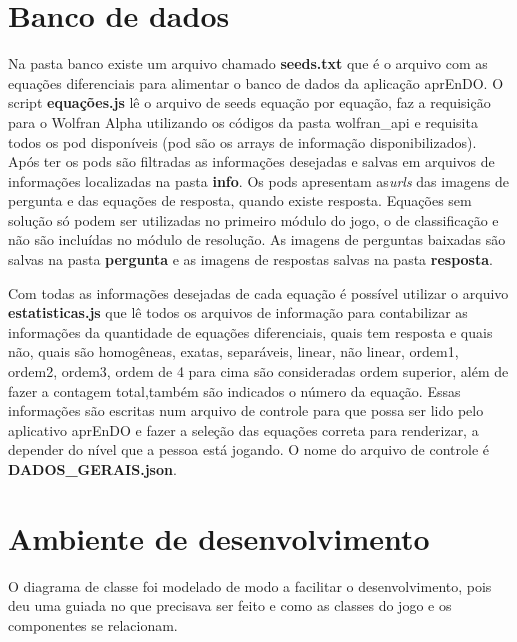 \section[Banco de dados]{Banco de dados} 
Na pasta banco existe um arquivo chamado \textbf{seeds.txt} que é o arquivo com as equações diferenciais para alimentar o banco de dados da aplicação aprEnDO. O script \textbf{equações.js} lê o arquivo de seeds equação por equação, faz a requisição para o Wolfran Alpha utilizando os códigos da pasta wolfran\_api e requisita todos os pod disponíveis (pod são os arrays de informação disponibilizados). Após ter os pods são filtradas as informações desejadas e salvas em arquivos de informações localizadas na pasta \textbf{info}. Os pods apresentam as\textit{urls} das imagens de pergunta e das equações de resposta, quando existe resposta. Equações sem solução só podem ser utilizadas no primeiro módulo do jogo, o de classificação e não são incluídas no módulo de resolução. As imagens de perguntas baixadas são salvas na pasta \textbf{pergunta} e as imagens de respostas salvas na pasta \textbf{resposta}.

Com todas as informações desejadas de cada equação é possível utilizar o arquivo \textbf{estatisticas.js} que lê todos os arquivos de informação para contabilizar as informações da quantidade de equações diferenciais, quais tem resposta e quais não, quais são homogêneas, exatas, separáveis, linear, não linear, ordem1, ordem2, ordem3, ordem de 4 para cima são consideradas ordem superior, além de fazer a contagem total,também são indicados o número da equação. Essas informações são escritas num arquivo de controle para que possa ser lido pelo aplicativo aprEnDO e fazer a seleção das equações correta para renderizar, a depender do nível que a pessoa está jogando. O nome do arquivo de controle é \textbf{DADOS\_GERAIS.json}.


\section[Ambiente de desenvolvimento]{Ambiente de desenvolvimento}

O diagrama de classe foi modelado de modo a facilitar o desenvolvimento, pois deu uma guiada no que precisava ser feito e como as classes do jogo e os componentes se relacionam. 

